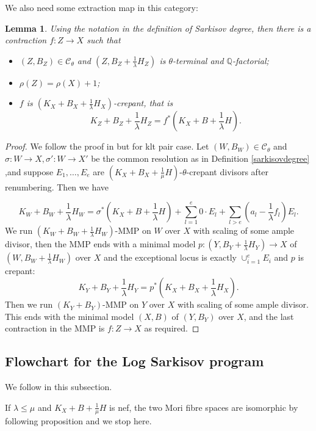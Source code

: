 \documentclass[11pt]{amsart}
\numberwithin{equation}{section}
\newtheorem{lem}[defn]{Lemma}
\begin{document}
We also need some  extraction map in this category: 
\begin{lem}\label{thetaextraction}
Using the notation in the definition of Sarkisov degree, then there is a contraction  $f:Z\to X$ such that 
\begin{itemize}
  \item $(Z,B_{Z})\in \mathcal{C}_{\theta}$ and $(Z,B_{Z}+\frac{1}{\lambda}H_{Z})$ is $\theta$-terminal and $\mathbb{Q}$-factorial;
    \item  $\rho(Z)=\rho(X)+1$;
    \item $f$ is $(K_{X}+B_{X}+\frac{1}{\lambda}H_{X})$-crepant, that is 
      \[
        K_{Z}+B_{Z}+\frac{1}{\lambda}H_{Z}=f^*(K_{X}+B+\frac{1}{\lambda}H)
      .\] 
\end{itemize}
\end{lem}
\begin{proof}
  We follow the proof in \cite[Proposition 1.6]{brunoLogSarkisovProgram1995} but for klt pair case.  Let $(W,B_{W})\in \mathcal{C}_{\theta}$ and $\sigma:W\to X,\sigma':W \to X'$ be the common resolution as in Definition \ref{sarkisovdegree} ,and suppose  $E_{1},\ldots ,E_{e}$ are   $(K_{X}+B_{X}+\frac{1}{\mu}H)$-$\theta$-crepant divisors after renumbering. Then we have

\[ K_W+B_W+\frac{1}{\lambda} H_W=\sigma^*(K_X+B+\frac{1}{\lambda} H)+\sum_{l=1}^{e} 0\cdot E_{l}+\sum_{l>e}(a_l-\frac{1}{\lambda} f_l)E_l .\]
We run $(K_{W}+B_{W}+\frac{1}{\lambda}H_{W})$-MMP on $W$ over $X$ with scaling of some ample divisor, then the MMP ends with a minimal model $p:(Y,B_{Y}+\frac{1}{\lambda}H_{Y})\to X$  of $(W,B_{W}+\frac{1}{\lambda}H_{W})$ over $X$ and the exceptional locus is exactly $\cup_{i=1}^{e}E_{i}$ and $p$ is crepant: 
\[
 K_{Y}+B_{Y}+\frac{1}{\lambda}H_{Y}=p^*(K_{X}+B_{X}+\frac{1}{\lambda}H_{X}) 
.\]
Then we run $(K_{Y}+B_{Y})$-MMP on $Y$ over $X$ with scaling of some ample divisor. This ends with the minimal model  $(X,B)$ of $(Y,B_{Y})$ over $X$, and the last contraction  in the MMP is $f:Z\to X$  as required.
\end{proof}
\subsection{Flowchart for the Log Sarkisov program}
We follow \cite[Flowchart for the Sarkisov program]{brunoLogSarkisovProgram1995} in this subsection.

If $ \lambda\leqslant\mu $ and $ K_X+B+\frac{1}{\mu}H $ is nef, the two Mori fibre spaces are isomorphic by following proposition and we stop here. 
\end{document}
